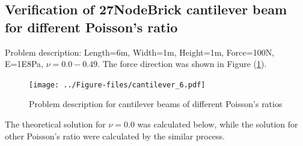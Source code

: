 \documentclass[fleqn,11pt]{article}
\begin{document}









\newpage
\subsection{Verification of 27NodeBrick cantilever beam for different Poisson's ratio}




Problem description: Length=6m, Width=1m, Height=1m, Force=100N, E=1E8Pa, $\nu=0.0-0.49$.
The force direction was shown in Figure (\ref{fig Problem description for cantilever beams of different Poisson's 27}). 

\begin{figure}[H]
  \centering
  \texttt{[image: ../Figure-files/cantilever\_6.pdf]}
  \caption{Problem description for cantilever beams of different Poisson's ratios}
  \label{fig Problem description for cantilever beams of different Poisson's 27}
\end{figure}

The theoretical solution for $\nu=0.0$ was calculated below, while the solution for other Poisson's ratio were calculated by the similar process. 
\end{document}

